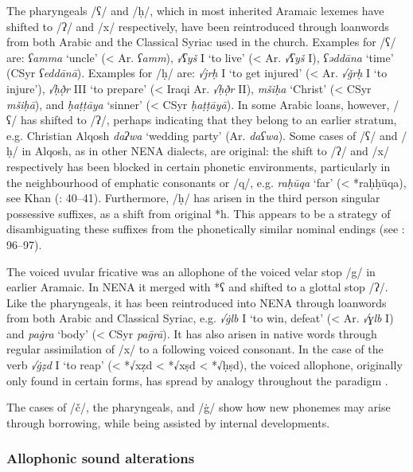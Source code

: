 \documentclass[output=paper]{langsci/langscibook}
\begin{document}
The pharyngeals /ʕ/ and /ḥ/, which in most inherited Aramaic lexemes have shifted to /ʔ/ and /x/ respectively, have been reintroduced through loanwords from both Arabic and the Classical Syriac used in the church. Examples for /ʕ/ are: \textit{ʕamma} ‘uncle’ (< Ar. \textit{ʕamm}), \textit{√ʕyš} I ‘to live’ (< Ar. \textit{√ʕyš} I), \textit{ʕəddāna} ‘time’ (CSyr \textit{ʕeddānā}). Examples for /ḥ/ are: \textit{√jrḥ} I ‘to get injured’ (< Ar. \textit{√ǧrḥ} I ‘to injure’), \textit{√ḥð̣r} III ‘to prepare’ (< Iraqi Ar. \textit{√ḥð̣r} II), \textit{mšiḥa} ‘Christ’ (< CSyr \textit{mšiḥā}), and \textit{ḥaṭṭāya} ‘sinner’ (< CSyr \textit{ḥaṭṭāyā}). In some Arabic loans, however, /ʕ/ has shifted to /ʔ/, perhaps indicating that they belong to an earlier stratum, e.g. Christian Alqosh \textit{daʔwa} ‘wedding party’ (Ar. \textit{daʕwa}). Some cases of /ʕ/ and /ḥ/ in Alqosh, as in other NENA dialects, are original: the shift to /ʔ/ and /x/ respectively has been blocked in certain phonetic environments, particularly in the neighbourhood of emphatic consonants or /q/, e.g. \textit{raḥūqa} ‘far’ (< *raḥḥūqa), see Khan (\citeyear{Khan2002}: 40–41). Furthermore, /ḥ/ has arisen in the third person singular possessive suffixes, as a shift from original *h. This appears to be a strategy of disambiguating these suffixes from the phonetically similar nominal endings (see \citealt{Coghill2008}: 96–97).

The voiced uvular fricative was an allophone of the voiced velar stop /g/ in earlier Aramaic. In NENA it merged with *ʕ and shifted to a glottal stop /ʔ/. Like the pharyngeals, it has been reintroduced into NENA through loanwords from both Arabic and Classical Syriac, e.g. \textit{√\.glb} I ‘to win, defeat’ (< Ar. \textit{√ɣlb} I) and \textit{pa\.gra} ‘body’ (< CSyr \textit{pa\={g}rā}). It has also arisen in native words through regular assimilation of /x/ to a following voiced consonant. In the case of the verb \textit{√\.gẓd} I ‘to reap’ (< *√xẓd < *√xṣd  < *√ḥṣd), the voiced allophone, originally only found in certain forms, has spread by analogy throughout the paradigm \citep[20]{Coghill2004}.

The cases of /č/, the pharyngeals, and /\.g/ show how new phonemes may arise through borrowing, while being assisted by internal developments.

\subsubsection{Allophonic sound alterations}
\end{document}
